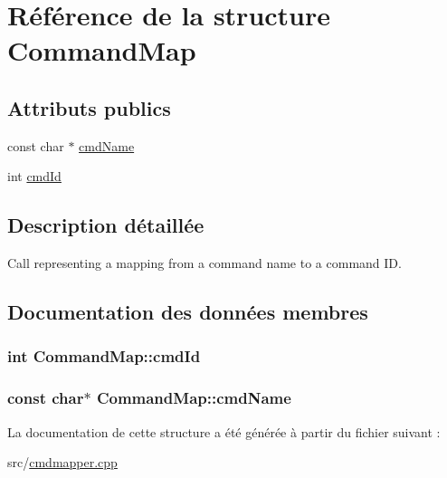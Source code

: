 \hypertarget{struct_command_map}{}\section{Référence de la structure Command\+Map}
\label{struct_command_map}
\subsection*{Attributs publics}
\begin{DoxyCompactItemize}
\item 
const char $\ast$ \hyperlink{struct_command_map_ac7eaac8a09da90b4f6e7dfae554cf46e}{cmd\+Name}
\item 
int \hyperlink{struct_command_map_a62c848e39548451d6aa2641791e2b33a}{cmd\+Id}
\end{DoxyCompactItemize}


\subsection{Description détaillée}
Call representing a mapping from a command name to a command I\+D. 

\subsection{Documentation des données membres}
\hypertarget{struct_command_map_a62c848e39548451d6aa2641791e2b33a}{}
\subsubsection[{cmd\+Id}]{\setlength{\rightskip}{0pt plus 5cm}int Command\+Map\+::cmd\+Id}\label{struct_command_map_a62c848e39548451d6aa2641791e2b33a}
\hypertarget{struct_command_map_ac7eaac8a09da90b4f6e7dfae554cf46e}{}
\subsubsection[{cmd\+Name}]{\setlength{\rightskip}{0pt plus 5cm}const char$\ast$ Command\+Map\+::cmd\+Name}\label{struct_command_map_ac7eaac8a09da90b4f6e7dfae554cf46e}


La documentation de cette structure a été générée à partir du fichier suivant \+:\begin{DoxyCompactItemize}
\item 
src/\hyperlink{cmdmapper_8cpp}{cmdmapper.\+cpp}\end{DoxyCompactItemize}
